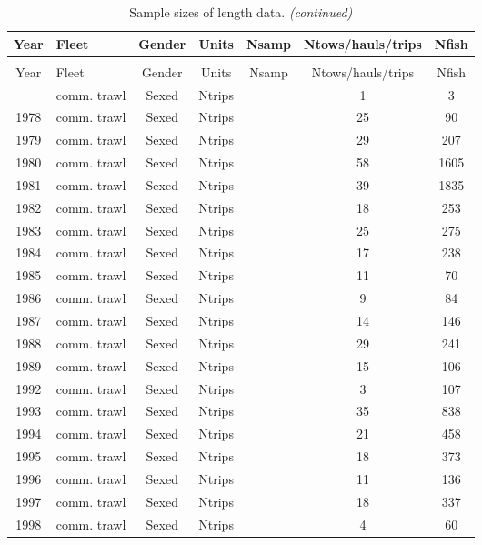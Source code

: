 \begingroup\fontsize{9}{11}\selectfont
\begingroup\fontsize{9}{11}\selectfont

\begin{longtable}[t]{c>{\centering\arraybackslash}p{3cm}ccccc}
\caption{\label{tab:sample-size-length}Sample sizes of length data.}\\
\toprule
Year & Fleet & Gender & Units & Nsamp & Ntows/hauls/trips & Nfish\\
\midrule
\endfirsthead
\caption[]{Sample sizes of length data. \textit{(continued)}}\\
\toprule
Year & Fleet & Gender & Units & Nsamp & Ntows/hauls/trips & Nfish\\
\midrule
\endhead

\endfoot
\bottomrule
\endlastfoot
1977 & comm. trawl & Sexed & Ntrips &  & 1 & 3\\
1978 & comm. trawl & Sexed & Ntrips &  & 25 & 90\\
1979 & comm. trawl & Sexed & Ntrips &  & 29 & 207\\
1980 & comm. trawl & Sexed & Ntrips &  & 58 & 1605\\
1981 & comm. trawl & Sexed & Ntrips &  & 39 & 1835\\
1982 & comm. trawl & Sexed & Ntrips &  & 18 & 253\\
1983 & comm. trawl & Sexed & Ntrips &  & 25 & 275\\
1984 & comm. trawl & Sexed & Ntrips &  & 17 & 238\\
1985 & comm. trawl & Sexed & Ntrips &  & 11 & 70\\
1986 & comm. trawl & Sexed & Ntrips &  & 9 & 84\\
1987 & comm. trawl & Sexed & Ntrips &  & 14 & 146\\
1988 & comm. trawl & Sexed & Ntrips &  & 29 & 241\\
1989 & comm. trawl & Sexed & Ntrips &  & 15 & 106\\
1992 & comm. trawl & Sexed & Ntrips &  & 3 & 107\\
1993 & comm. trawl & Sexed & Ntrips &  & 35 & 838\\
1994 & comm. trawl & Sexed & Ntrips &  & 21 & 458\\
1995 & comm. trawl & Sexed & Ntrips &  & 18 & 373\\
1996 & comm. trawl & Sexed & Ntrips &  & 11 & 136\\
1997 & comm. trawl & Sexed & Ntrips &  & 18 & 337\\
1998 & comm. trawl & Sexed & Ntrips &  & 4 & 60\\

\end{longtable}
